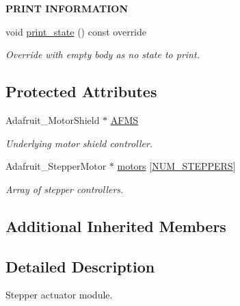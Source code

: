 \begin{Indent}{\bf P\+R\+I\+NT I\+N\+F\+O\+R\+M\+A\+T\+I\+ON}\par
\begin{DoxyCompactItemize}
\item 
void \hyperlink{class_loom___stepper_a8aaf4b82032fc4b4cdd1ea1b9f289de1}{print\+\_\+state} () const override
\begin{DoxyCompactList}\small\item\em Override with empty body as no state to print. \end{DoxyCompactList}\end{DoxyCompactItemize}
\end{Indent}
\subsection*{Protected Attributes}
\begin{DoxyCompactItemize}
\item 
Adafruit\+\_\+\+Motor\+Shield $\ast$ \hyperlink{class_loom___stepper_a6e1cef0a5db1d2d69c1fb09f1046770a}{A\+F\+MS}
\begin{DoxyCompactList}\small\item\em Underlying motor shield controller. \end{DoxyCompactList}\item 
Adafruit\+\_\+\+Stepper\+Motor $\ast$ \hyperlink{class_loom___stepper_a208acec02d1249fb449a17ca5e334cee}{motors} \mbox{[}\hyperlink{_stepper_8h_ae3d2a049ddf3e37949151dc679915aa3}{N\+U\+M\+\_\+\+S\+T\+E\+P\+P\+E\+RS}\mbox{]}
\begin{DoxyCompactList}\small\item\em Array of stepper controllers. \end{DoxyCompactList}\end{DoxyCompactItemize}
\subsection*{Additional Inherited Members}


\subsection{Detailed Description}
Stepper actuator module. 

